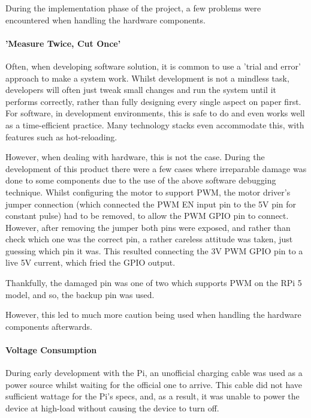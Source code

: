                 During the implementation phase of the project, a few problems were encountered when handling the hardware components.
    
                \paragraph{'Measure Twice, Cut Once'}
    
                    Often, when developing software solution, it is common to use a 'trial and error' approach to make a system work. Whilst development is not a mindless task, developers will often just tweak small changes and run the system until it performs correctly, rather than fully designing every single aspect on paper first. For software, in development environments, this is safe to do and even works well as a time-efficient practice. Many technology stacks even accommodate this, with features such as hot-reloading.
    
                    However, when dealing with hardware, this is not the case. During the development of this product there were a few cases where irreparable damage was done to some components due to the use of the above software debugging technique. Whilst configuring the motor to support PWM, the motor driver's jumper connection (which connected the PWM EN input pin to the 5V pin for constant pulse) had to be removed, to allow the PWM GPIO pin to connect. However, after removing the jumper both pins were exposed, and rather than check which one was the correct pin, a rather careless attitude was taken, just guessing which pin it was. This resulted connecting the 3V PWM GPIO pin to a live 5V current, which fried the GPIO output.
    
                    Thankfully, the damaged pin was one of two which supports PWM on the RPi 5 model, and so, the backup pin was used.
    
                    However, this led to much more caution being used when handling the hardware components afterwards.
    
                \paragraph{Voltage Consumption}
    
                    During early development with the Pi, an unofficial charging cable was used as a power source whilst waiting for the official one to arrive. This cable did not have sufficient wattage for the Pi's specs, and, as a result, it was unable to power the device at high-load without causing the device to turn off.
    
